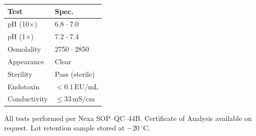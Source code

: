 \documentclass[10pt,a4paper]{article}
\begin{document}
\begin{minipage}[t]{0.32\linewidth}
  \begin{tcolorbox}[
    enhanced, arc=4pt, boxrule=0.6pt,
    colback=NexaTeal!6, colframe=NexaTeal,
    title={\faVial\enskip QC Release Criteria},
    fonttitle=\bfseries\color{white}, coltitle=white,
    attach boxed title to top left={yshift=-2mm,xshift=4mm},
    boxed title style={enhanced, arc=3pt, colback=NexaTeal, colframe=NexaTeal, boxrule=0pt},
    top=6mm, bottom=4mm, left=4mm, right=4mm,
  ]
    \small\color{NexaText}
    \renewcommand{\arraystretch}{1.3}
    \begin{tabular}{@{}p{2.5cm}l@{}}
      \textbf{Test} & \textbf{Spec.} \\
      \midrule
      pH (10$\times$) & 6.8\,--\,7.0 \\
      pH (1$\times$)  & 7.2\,--\,7.4 \\
      Osmolality      & 2750\,--\,2850 \\
      Appearance      & Clear \\
      Sterility       & Pass (sterile) \\
      Endotoxin       & $<\!0.1\,\text{EU/mL}$ \\
      Conductivity    & $\leq 33\,\text{mS/cm}$ \\
    \end{tabular}

    \vspace{2mm}
    {\scriptsize\color{NexaSubtle}
     All tests performed per Nexa SOP--QC--44B.
     Certificate of Analysis available on request.
     Lot retention sample stored at $-20\,^{\circ}$C.}
  \end{tcolorbox}
\end{minipage}

\vspace{5mm}
\end{document}
